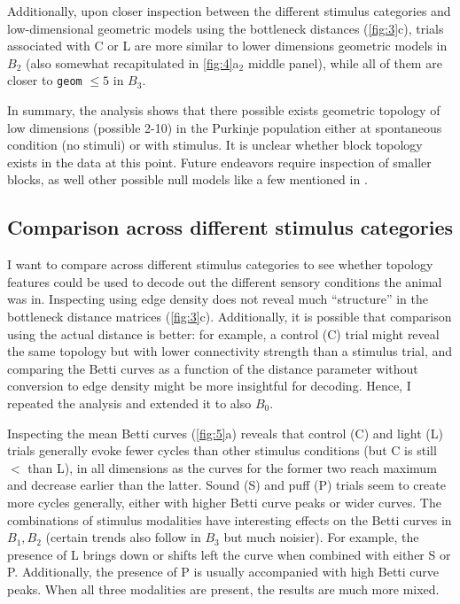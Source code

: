 Additionally, upon closer inspection between the different stimulus categories and low-dimensional geometric models using the bottleneck distances (\autoref{fig:3}c), trials associated with C or L are more similar to lower dimensions geometric models in $B_2$ (also somewhat recapitulated in \autoref{fig:4}a$_2$ middle panel), while all of them are closer to \texttt{geom} $\le 5$ in $B_3$.

In summary, the analysis shows that there possible exists geometric topology of low dimensions (possible 2-10) in the Purkinje population either at spontaneous condition (no stimuli) or with stimulus. It is unclear whether block topology exists in the data at this point. Future endeavors require inspection of smaller blocks, as well other possible null models like a few mentioned in \cite{Blevins2021-tf}.

\subsection{Comparison across different stimulus categories}

I want to compare across different stimulus categories to see whether topology features could be used to decode out the different sensory conditions the animal was in. Inspecting using edge density does not reveal much ``structure'' in the bottleneck distance matrices (\autoref{fig:3}c). Additionally, it is possible that comparison using the actual distance is better: for example, a control (C) trial might reveal the same topology but with lower connectivity strength than a stimulus trial, and comparing the Betti curves as a function of the distance parameter without conversion to edge density might be more insightful for decoding. Hence, I repeated the analysis and extended it to also $B_0$.

Inspecting the mean Betti curves (\autoref{fig:5}a) reveals that control (C) and light (L) trials generally evoke fewer cycles than other stimulus conditions (but C is still $<$ than L), in all dimensions as the curves for the former two reach maximum and decrease earlier than the latter. Sound (S) and puff (P) trials seem to create more cycles generally, either with higher Betti curve peaks or wider curves. The combinations of stimulus modalities have interesting effects on the Betti curves in $B_1,B_2$ (certain trends also follow in $B_3$ but much noisier). For example, the presence of L brings down or shifts left the curve when combined with either S or P. Additionally, the presence of P is usually accompanied with high Betti curve peaks. When all three modalities are present, the results are much more mixed.

